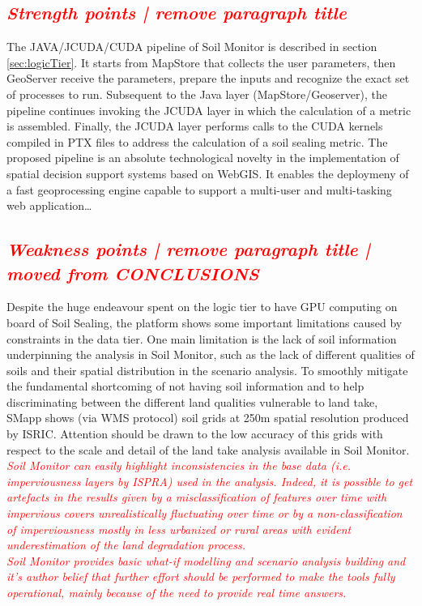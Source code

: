 \documentclass[APA,LATO1COL,doublespace]{WileyNJD-v2}
\newcommand{\toberevised}[1]{\emph{\textcolor{red}{#1}}} %
\begin{document}
\subsection{ \toberevised{Strength points | remove paragraph title} }
The JAVA/JCUDA/CUDA pipeline of Soil Monitor is described in section \ref{sec:logicTier}.
It starts from MapStore that collects the user parameters, then GeoServer receive the parameters, prepare the inputs and recognize the exact set of processes to run.
Subsequent to the Java layer (MapStore/Geoserver), the pipeline continues invoking the JCUDA layer in which the calculation of a metric is assembled.
Finally, the JCUDA layer performs calls to the CUDA kernels compiled in PTX files to address the calculation of a soil sealing metric.
The proposed pipeline is an absolute technological novelty in the implementation of spatial decision support systems based on WebGIS.
It enables the deploymeny of a fast geoprocessing engine capable to support a multi-user and multi-tasking web application\ldots

\subsection{ \toberevised{Weakness points | remove paragraph title | moved from CONCLUSIONS} }
Despite the huge endeavour spent on the logic tier to have GPU computing on board of Soil Sealing, the platform shows some important limitations caused by constraints in the data tier.
One main limitation is the lack of soil information underpinning the analysis in Soil Monitor, such as the lack of different qualities of soils and their spatial distribution in the scenario analysis.
To smoothly mitigate the fundamental shortcoming of not having soil information and to help discriminating between the different land qualities vulnerable to land take, SMapp shows (via WMS protocol) soil grids at 250m spatial resolution produced by ISRIC.
Attention should be drawn to the low accuracy of this grids with respect to the scale and detail of the land take analysis available in Soil Monitor.
\toberevised{
Soil Monitor can easily highlight inconsistencies in the base data (i.e. imperviousness layers by ISPRA) used in the analysis.
Indeed, it is possible to get artefacts in the results given by a misclassification of features over time with impervious covers unrealistically fluctuating over time or by a non-classification of imperviousness mostly in less urbanized or rural areas with evident underestimation of the land degradation process.\\
Soil Monitor provides basic \textit{what-if} modelling and scenario analysis building and it's author belief that further effort should be performed to make the tools fully operational, mainly because of the need to provide real time answers.
}
\end{document}
